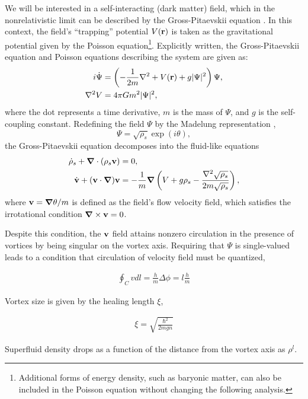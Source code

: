 \documentclass[aps,prd,twocolumn,nofootinbib,superscriptaddress]{revtex4-1}
\newcommand{\bfnab}{{\boldsymbol \nabla}}
\begin{document}
We will be interested in a self-interacting (dark matter) field, which in the nonrelativistic limit can be described by the Gross-Pitaevskii equation \cite{Hui:2016ltb}.  In this context, the field's ``trapping'' potential $V({\bf r})$ is taken as the gravitational potential given by the Poisson equation\footnote{Additional forms of energy density, such as baryonic matter, can also be included in the Poisson equation without changing the following analysis.}.  Explicitly written, the Gross-Pitaevskii equation and Poisson equations describing the system are given as:
\begin{align}
i\dot{\Psi} &= \left(-\frac{1}{2m}\nabla^2 + V({\bf r}) + g |\Psi|^2\right)\Psi, \\
\nabla^2 V &= 4\pi G m^2|\Psi|^2,
\end{align}
where the dot represents a time derivative, $m$ is the mass of $\Psi$, and $g$ is the self-coupling constant.  Redefining the field $\Psi$ by the Madelung representation \cite{Madelung},
\begin{equation}
\Psi = \sqrt{\rho_s}\exp(i\theta),
\end{equation}
the Gross-Pitaevskii equation decomposes into the fluid-like equations
\begin{align}
\dot{\rho}_s + \bfnab \cdot\left(\rho_s{\bf v}\right) &= 0,\label{Eq:Continuity}\\
\dot{\bf v} + ({\bf v}\cdot\bfnab){\bf v} &= -\frac{1}{m}\bfnab\left(V + g\rho_s - \frac{\nabla^2\sqrt{\rho_s}}{2m\sqrt{\rho_s}}\right),\label{Eq:Flow}
\end{align}
where ${\bf v} = \bfnab\theta/m$ is defined as the field's flow velocity field, which satisfies the irrotational condition $\bfnab \times {\bf v} = 0$.

Despite this condition, the $\bf v$ field attains nonzero circulation in the presence of vortices by being singular on the vortex axis. Requiring that $\Psi$ is single-valued leads to a condition that circulation of velocity field must be quantized,

\begin{align}
\oint_C v dl = \frac{h}{m} \Delta \phi = l \frac{h}{m}  
\end{align}

Vortex size is given by the healing length $\xi$,

\begin{align}
\xi = \sqrt{\frac{\hbar^2}{2 m g n}}
\end{align}

Superfluid density drops as a function of the distance from the vortex axis as $\rho^l$.
\end{document}
